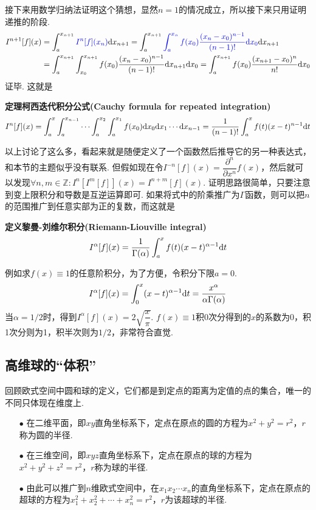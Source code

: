\documentclass[UTF8]{ctexart}
\newcommand{\trm}[1]{{\rm #1}}
\newenvironment{definition}[1]
    {\begin{tcolorbox}[enhanced, colback=LightYellow, breakable=false, frame hidden, borderline west={1.5mm}{-2mm}{DarkGreen}]
    {\bfseries {\color{DarkGreen} 定义}\quad #1} \newline}
    {\end{tcolorbox}}
\newenvironment{theorem}[1]
    {\begin{tcolorbox}[enhanced, colback=LightYellow, breakable=true, frame hidden, borderline west={1.5mm}{-2mm}{DarkBlue}]
    {\bfseries {\color{DarkBlue} 定理}\quad #1} \newline}
    {\end{tcolorbox}}
\begin{document}
接下来用数学归纳法证明这个猜想，显然\(n=1\)的情况成立，所以接下来只用证明递推的阶段.
\begin{align*}
    I^{n+1}[f](x) &= \int_{a}^{x_{n+1}}{\color{blue}I^n[f](x_n)}\trm{d}x_{n+1} = \int_{a}^{x_{n+1}}{\color{blue}\int_{a}^{x_n}f(x_0)\frac{(x_n-x_0)^{n-1}}{(n-1)!}\trm{d}x_{0}}\trm{d}x_{n+1} \\
    &= \int_{a}^{x_{n+1}}\int_{x_0}^{x_{n+1}}f(x_0)\frac{(x_n-x_0)^{n-1}}{(n-1)!}\trm{d}x_{n+1}\trm{d}x_0 = \int_{a}^{x_{n+1}}f(x_0)\frac{(x_{n+1}-x_0)^n}{n!}\trm{d}x_0
\end{align*}
证毕. 这就是
\begin{theorem}{柯西迭代积分公式(Cauchy formula for repeated integration)}
    \[I^n[f](x) = \int_{a}^{x} \int_{a}^{x_{n-1}} \cdots \int_{a}^{x_2}\int_{a}^{x_1}f(x_0)\trm{d}x_0 \trm{d}x_1 \cdots \trm{d}x_{n-1} = \frac{1}{(n-1)!}\int_{a}^{x}f(t)(x-t)^{n-1}\trm{d}t\]
\end{theorem}

以上讨论了这么多，看起来就是随便定义了一个函数然后推导它的另一种表达式，和本节的主题似乎没有联系. 但假如现在令\(I^{-n}[f](x) = \dfrac{\partial^n}{\partial x^n}f(x)\)，然后就可以发现\(\forall n,m \in \mathbb{Z}: I^{n}[I^{m}[f]](x) = I^{n+m}[f](x)\). 证明思路很简单，只要注意到变上限积分和导数是互逆运算即可. 如果将式中的阶乘推广为\(\Gamma\)函数，则可以把\(n\)的范围推广到任意实部为正的复数，而这就是
\begin{definition}{黎曼-刘维尔积分(Riemann-Liouville integral)}
    \[I^{\alpha}[f](x) = \frac{1}{\Gamma(\alpha)}\int_{a}^{x}f(t)(x-t)^{\alpha-1}\trm{d}t\]
\end{definition}

例如求\(f(x)\equiv 1\)的任意阶积分，为了方便，令积分下限\(a=0\).
\[I^{\alpha}[f](x) = \int_{0}^{x}(x-t)^{\alpha-1}\trm{d}t = \frac{x^{\alpha}}{\alpha\Gamma(\alpha)}\]
当\(\alpha=1/2\)时，得到\(I^{\alpha}[f](x) = 2\sqrt{\dfrac{x}{\pi}}\). \(f(x) \equiv 1\)积0次分得到的\(x\)的系数为\(0\)，积1次分则为1，积半次则为\(1/2\)，非常符合直觉.

\subsection{高维球的“体积”}

回顾欧式空间中圆和球的定义，它们都是到定点的距离为定值的点的集合，唯一的不同只体现在维度上.
\begin{itemize}
    \item[\(\bullet\)] 在二维平面，即\(xy\)直角坐标系下，定点在原点的圆的方程为\(x^2+y^2=r^2\)，\(r\)称为圆的半径.
    \item[\(\bullet\)] 在三维空间，即\(xyz\)直角坐标系下，定点在原点的球的方程为\(x^2+y^2+z^2=r^2\)，\(r\)称为球的半径.
    \item[\(\bullet\)] 由此可以推广到\(n\)维欧式空间中，在\(x_1x_2\cdots x_n\)的直角坐标系下，定点在原点的超球的方程为\(x_1^2+x_2^2+\cdots+x_n^2=r^2\)，\(r\)为该超球的半径.
\end{itemize}
\end{document}
